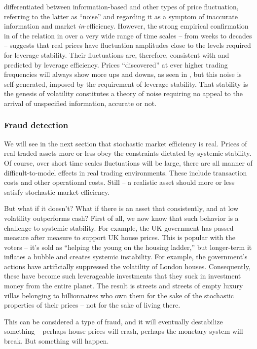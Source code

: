 \citet{Black1986} differentiated between information-based and other types of price fluctuation, referring to the latter as ``noise'' and regarding it as a symptom of inaccurate information and market {\it in}-efficiency. However, the strong empirical confirmation in  of the relation in  over a very wide range of time scales -- from weeks to decades -- suggests that real prices have fluctuation amplitudes close to the levels required for leverage stability. Their fluctuations are, therefore, consistent with and predicted by leverage efficiency. Prices ``discovered'' at ever higher trading frequencies will always show more ups and downs, as seen in , but this noise is self-generated, imposed by the requirement of leverage stability. That stability is the genesis of volatility constitutes a theory of noise requiring no appeal to the arrival of unspecified information, accurate or not.

\subsubsection{Fraud detection}
We will see in the next section that stochastic market efficiency is real. Prices of real traded assets more or less obey the constraints dictated by systemic stability. Of course, over short time scales fluctuations will be large, there are all manner of difficult-to-model effects in real trading environments. These include transaction costs and other operational costs. Still -- a realistic asset should more or less satisfy stochastic market efficiency.

But what if it doesn't? What if there is an asset that consistently, and at low volatility outperforms cash? First of all, we now know that such behavior is a challenge to systemic stability. For example, the UK government has passed measure after measure to support UK house prices. This is popular with the voters -- it's sold as ``helping the young on the housing ladder,'' but longer-term it inflates a bubble and creates systemic instability. For example, the government's actions have artificially suppressed the volatility of London houses. Consequently, these have become such leverageable investments that they suck in investment money from the entire planet. The result is streets and streets of empty luxury villas belonging to billionnaires who own them for the sake of the stochastic properties of their prices -- not for the sake of living there.

This can be considered a type of fraud, and it will eventually destabilize something -- perhaps house prices will crash, perhaps the monetary system will break. But something will happen.

